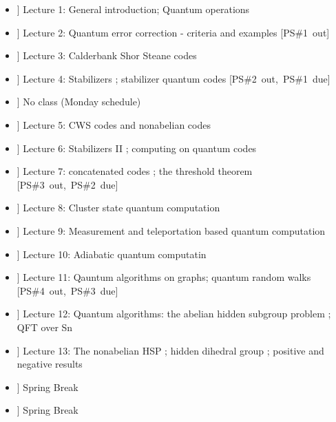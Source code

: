 \documentclass[preprint,pra,12pt]{ikedoc3}
\begin{document}
\begin{itemize}
\item[\bf [T 05-Feb]] Lecture 1: General introduction; Quantum operations
\item[\bf [R 07-Feb]] Lecture 2: Quantum error correction - criteria
and examples 
                        \hfill \mbox{[PS\#1 out] }

\item[\bf [T 12-Feb]] Lecture 3: Calderbank Shor Steane codes 

\item[\bf [R 14-Feb]] Lecture 4: Stabilizers ; stabilizer quantum
codes  \hfill \mbox{[PS\#2 out, PS\#1 due]}

\item[\bf [T 19-Feb]] No class (Monday schedule) 

\item[\bf [R 21-Feb]] Lecture 5: CWS codes and nonabelian codes

\item[\bf [T 26-Feb]] Lecture 6: Stabilizers II ; computing on quantum
codes 

\item[\bf [R 28-Feb]] Lecture 7: concatenated codes ; the threshold
theorem \hfill \mbox{[PS\#3 out, PS\#2 due] }

\item[\bf [T 04-Mar]] Lecture 8: Cluster state quantum computation 

\item[\bf [R 06-Mar]] Lecture 9: Measurement and teleportation based
quantum computation 

\item[\bf [T 11-Mar]] Lecture 10: Adiabatic quantum computatin 

\item[\bf [R 13-Mar]] Lecture 11: Qauntum algorithms on graphs;
quantum random walks  \hfill \mbox{[PS\#4 out, PS\#3 due]}

\item[\bf [T 18-Mar]] Lecture 12: Quantum algorithms: the abelian
hidden subgroup problem ; QFT over Sn 

\item[\bf [R 20-Mar]] Lecture 13: The nonabelian HSP ; hidden dihedral
group ; positive and negative results 

\item[\bf [T 25-Mar]] Spring Break
 

\item[\bf [R 29-Mar]] Spring Break
 


\end{itemize}
\end{document}
